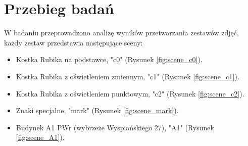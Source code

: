 \graphicspath{ {./img/data/} }

\chapter{Przebieg badań}

W badaniu przeprowadzono analizę wyników przetwarzania zestawów zdjęć, każdy zestaw przedstawia następujące sceny:
\begin{itemize}
   \item Kostka Rubika na podstawce, "c0" (Rysunek \ref{fig:scene_c0}).
   \item Kostka Rubika z oświetleniem zmiennym, "c1" (Rysunek \ref{fig:scene_c1}).
   \item Kostka Rubika z oświetleniem punktowym, "c2" (Rysunek \ref{fig:scene_c2}).
   \item Znaki specjalne, "mark" (Rysunek \ref{fig:scene_mark}).
   \item Budynek A1 PWr (wybrzeże Wyspiańskiego 27), "A1" (Rysunek \ref{fig:scene_A1}).
\end{itemize}


